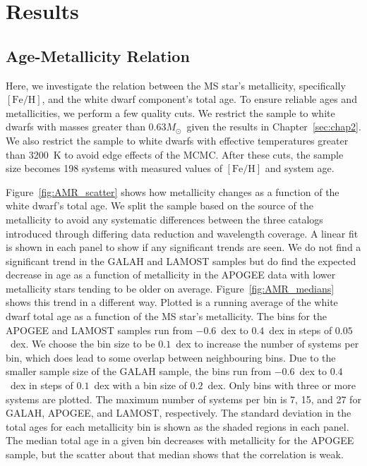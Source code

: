 \documentclass[twocolumn,linenumbers]{aastex631}
\newcommand{\msun}{$M_{\odot}$}
\begin{document}
\section{Results}\label{sec:chap4_results}

\subsection{Age-Metallicity Relation}\label{sec:metal}

Here, we investigate the relation between the MS star's metallicity, specifically $\left[\mathrm{Fe/H}\right]$, and the white dwarf component's total age. To ensure reliable ages and metallicities, we perform a few quality cuts. We restrict the sample to white dwarfs with masses greater than 0.63\msun\ given the results in Chapter~\ref{sec:chap2}. We also restrict the sample to white dwarfs with effective temperatures greater than 3200~K to avoid edge effects of the MCMC. After these cuts, the sample size becomes 198 systems with measured values of $\left[\mathrm{Fe/H}\right]$ and system age.

Figure~\ref{fig:AMR_scatter} shows how metallicity changes as a function of the white dwarf's total age. We split the sample based on the source of the metallicity to avoid any systematic differences between the three catalogs introduced through differing data reduction and wavelength coverage. A linear fit is shown in each panel to show if any significant trends are seen. We do not find a significant trend in the GALAH and LAMOST samples but do find the expected decrease in age as a function of metallicity in the APOGEE data with lower metallicity stars tending to be older on average. Figure~\ref{fig:AMR_medians} shows this trend in a different way. Plotted is a running average of the white dwarf total age as a function of the MS star's metallicity. The bins for the APOGEE and LAMOST samples run from $-0.6$~dex to $0.4$~dex in steps of $0.05$~dex. We choose the bin size to be $0.1$~dex to increase the number of systems per bin, which does lead to some overlap between neighbouring bins. Due to the smaller sample size of the GALAH sample, the bins run from $-0.6$~dex to $0.4$~dex in steps of $0.1$~dex with a bin size of $0.2$~dex. Only bins with three or more systems are plotted. The maximum number of systems per bin is 7, 15, and 27 for GALAH, APOGEE, and LAMOST, respectively. The standard deviation in the total ages for each metallicity bin is shown as the shaded regions in each panel. The median total age in a given bin decreases with metallicity for the APOGEE sample, but the scatter about that median shows that the correlation is weak.
\end{document}
